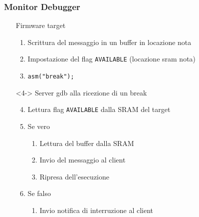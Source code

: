 \documentclass[aspectratio=169,
]{beamer}
\begin{document}
    \begin{frame}
        \frametitle{Monitor Debugger}
        \hspace*{-10mm}\begin{minipage}{.7\textwidth}
            \begin{itemize}
                \item[] Firmware target
                \begin{enumerate}
                    \item <1-> Scrittura del messaggio in un buffer in locazione nota
                    \item <2-> Impostazione del flag \texttt{AVAILABLE} (locazione sram nota)
                    \item <3-> \texttt{asm("break");}
                \end{enumerate}
                \item[] <4-> Server gdb alla ricezione di un break
                \begin{enumerate}
                    \setcounter{enumi}{3}
                    \item <4-> Lettura flag \texttt{AVAILABLE} dalla SRAM del target
                    \item <5-> Se vero
                    \begin{enumerate}
                        \item <5-> Lettura del buffer dalla SRAM
                        \item <5-> Invio del messaggio al client
                        \item <5-> Ripresa dell'esecuzione
                    \end{enumerate}
                    \item <6-> Se falso
                    \begin{enumerate}
                        \item <6-> Invio notifica di interruzione al client
                    \end{enumerate}
                \end{enumerate}
            \end{itemize}     
        \end{minipage}
        \begin{minipage}{.28\textwidth}
            \begin{figure}
                \begin{tikzpicture}[scale=.8, label distance=-2mm]


\end{tikzpicture}
\end{figure}
\end{minipage}
\end{frame}
\end{document}
